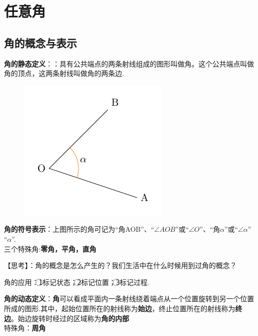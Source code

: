 \makefront
\vspace{-1.5em}

\section{任意角}
\subsection{角的概念与表示}
{\bf 角的静态定义}：：具有公共端点的两条射线组成的图形叫做角。这个公共端点叫做角的顶点，这两条射线叫做角的两条边.\\
\begin{figure}[htbp]
  \centering
  \includegraphics[scale=0.8]{Fig.ArbitraryAngle.pdf}
\end{figure}\par
{\bf 角的符号表示}：上图所示的角可记为“角AOB”、“$\angle{AOB}$”或“$\angle O$”、“角$\alpha$”或“$\angle\alpha$”
“$\alpha$”.\\
三个特殊角:{\bf\kaishu 零角，平角，直角}\par
{\heiti 【思考】}：角的概念是怎么产生的？我们生活中在什么时候用到过角的概念？\par
\vspace{5em}
{角的应用}：\textcircled{1}标记状态；\textcircled{2}标记位置；\textcircled{3}标记过程.\par
{\bf 角的动态定义}：{\bf \kaishu 角}可以看成平面内一条射线绕着端点从一个位置旋转到另一个位置所成的图形.其中，起始位置所在的射线称为{\bf \kaishu 始边}，终止位置所在的射线称为{\bf\kaishu 终边}。始边旋转时经过的区域称为{\bf \kaishu 角的内部}\\
特殊角：{\bf\kaishu 周角}\par

